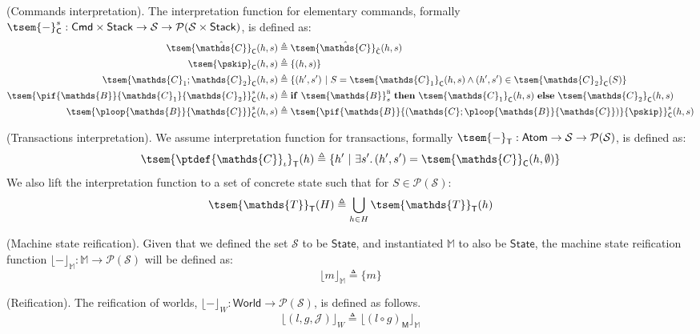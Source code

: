 \param (Commands interpretation). The interpretation function for elementary commands, formally $\tsem{-}^s_{\mathsf{C}} : \mathsf{Cmd} \times \mathsf{Stack} \rightarrow \mathcal{S} \rightarrow \mathcal{P}(\mathcal{S} \times \mathsf{Stack})$, is defined as:
\begin{align*}
	\tsem{\hat{\mathds{C}}}_{\mathsf{C}}(h, s) &\triangleq \tsem{\hat{\mathds{C}}}_{\hat{\mathsf{C}}}(h, s)
	\\
	\tsem{\pskip}_{\mathsf{C}}(h, s) &\triangleq \{(h, s)\}
	\\
	\tsem{\mathds{C}_1 ; \mathds{C}_2}_{\mathsf{C}}(h, s) &\triangleq \{ (h', s')\ |\ S = \tsem{\mathds{C}_1}_\mathsf{C}(h, s) \land (h', s') \in \tsem{\mathds{C}_2}_\mathsf{C}(S) \}
	\\
	\tsem{\pif{\mathds{B}}{\mathds{C}_1}{\mathds{C}_2}}^s_\mathsf{C}(h, s) &\triangleq \mathbf{if}\ \tsem{\mathds{B}}^\textsc{b}_s\ \mathbf{then}\ \tsem{\mathds{C}_1}_\mathsf{C}(h, s)\ \mathbf{else}\ \tsem{\mathds{C}_2}_\mathsf{C}(h, s)
	\\
	\tsem{\ploop{\mathds{B}}{\mathds{C}}}^s_\mathsf{C}(h, s) &\triangleq \tsem{\pif{\mathds{B}}{\left(\mathds{C};\ploop{\mathds{B}}{\mathds{C}}\right)}{\pskip}}_\mathsf{C}^s(h, s)
\end{align*}

\param (Transactions interpretation). We assume interpretation function for transactions, formally $\tsem{-}_\mathsf{T} : \mathsf{Atom} \rightarrow \mathcal{S} \rightarrow \mathcal{P}(\mathcal{S})$, is defined as:
\[
	\tsem{\ptdef{\mathds{C}}_\iota}_\mathsf{T}(h) \triangleq \{ h'\ |\ \exists s' \ldotp (h', s') = \tsem{\mathds{C}}_\mathsf{C}(h, \emptyset) \}
\]
We also lift the interpretation function to a set of concrete state such that for $S \in \mathcal{P}(\mathcal{S})$:
\[
	\tsem{\mathds{T}}_\mathsf{T}(H) \triangleq \bigcup_{h \in H}  \tsem{\mathds{T}}_\mathsf{T}(h)
\]	

\param (Machine state reification). Given that we defined the set $\mathcal{S}$ to be $\mathsf{State}$, and instantiated $\mathbb{M}$ to also be $\mathsf{State}$, the machine state reification function $\lfloor - \rfloor_\mathbb{M} : \mathbb{M} \rightarrow \mathcal{P}(\mathcal{S})$ will be defined as:
\[
	\lfloor m \rfloor_\mathbb{M} \triangleq \{ m \}
\]

 (Reification). The reification of worlds, $\lfloor - \rfloor_W : \mathsf{World} \rightarrow \mathcal{P}(\mathcal{S})$, is defined as follows.
\[
	\lfloor (l, g, \mathcal{J}) \rfloor_W \triangleq \lfloor (l \circ g)_\mathsf{M} \rfloor_\mathbb{M}
\]


